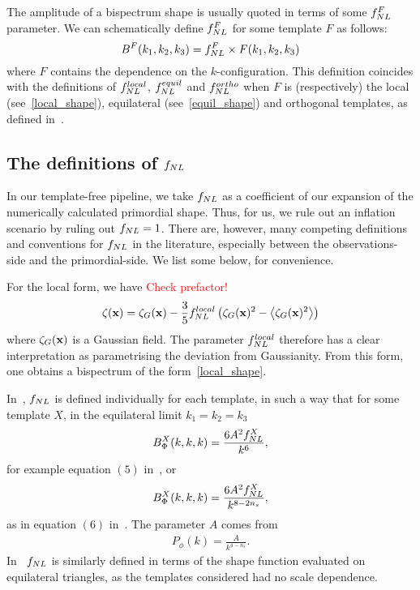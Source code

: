 The amplitude of a bispectrum shape is usually
quoted in terms of some $f_{NL}^F$ parameter.
We can schematically define $f_{NL}^F$ for some template $F$ as follows:
\begin{equation}\label{def:fnl}
{
B^{F}(k_1,k_2,k_3) = f_{NL}^{F}\times F(k_1,k_2,k_3)
}
\end{equation}
where $F$ contains the dependence on the $k$-configuration.
This definition coincides with the definitions of
$f^{local}_{NL}$, $f^{equil}_{NL}$ and $f^{ortho}_{NL}$
when $F$ is (respectively) the local (see~\eqref{local_shape}),
equilateral (see~\eqref{equil_shape}) and orthogonal templates,
as defined in~\cite{Planck_NG_2013, Planck_NG_2015}.

    \subsection{The definitions of $f_{NL}$}
    In our template-free pipeline, we take $f_{NL}$ as a coefficient of our expansion
    of the numerically calculated primordial shape. Thus, for us, we rule out an
    inflation scenario by ruling out $f_{NL}=1$. There are, however, many competing
    definitions and conventions for $f_{NL}$ in the literature, especially between
    the observations-side and the primordial-side. We list some below, for convenience.


    For the local form, we have \textcolor{red}{Check prefactor!}
    \begin{align}
        \zeta(\mathbf{x}) = \zeta_G(\mathbf{x}) - \frac{3}{5}f^{local}_{NL}\left(\zeta_G(\mathbf{x})^2-\left<\zeta_G(\mathbf{x})^2\right>\right)
    \end{align}
    where $\zeta_G(\mathbf{x})$ is a Gaussian field. The parameter $f^{local}_{NL}$ therefore has a clear
    interpretation as parametrising the deviation from Gaussianity. From this form,
    one obtains a bispectrum of the form~\eqref{local_shape}.


    In~\cite{Planck_NG_2013}, $f_{NL}$ is defined individually for each template, in such a way
    that for some template $X$, in the equilateral limit $k_1=k_2=k_3$
    \begin{align}
        B^X_\Phi(k,k,k) = \frac{6A^2f_{NL}^X}{k^6},
    \end{align}
    for example equation $(5)$ in~\cite{Planck_NG_2013},
    or
    \begin{align}
        B^X_\Phi(k,k,k) = \frac{6A^2f_{NL}^X}{k^{8-2n_s}},
    \end{align}
    as in equation $(6)$ in~\cite{Planck_NG_2013}.
    The parameter $A$ comes from
    \begin{align}
        P_\phi(k) = \frac{A}{k^{4-n_s}}.
    \end{align}
    In~\cite{seery_ng_0503, chen_ng_0605, dbi_in_the_sky} $f_{NL}$ is similarly defined in terms
    of the shape function evaluated on equilateral triangles,
    as the templates considered had no scale dependence.


